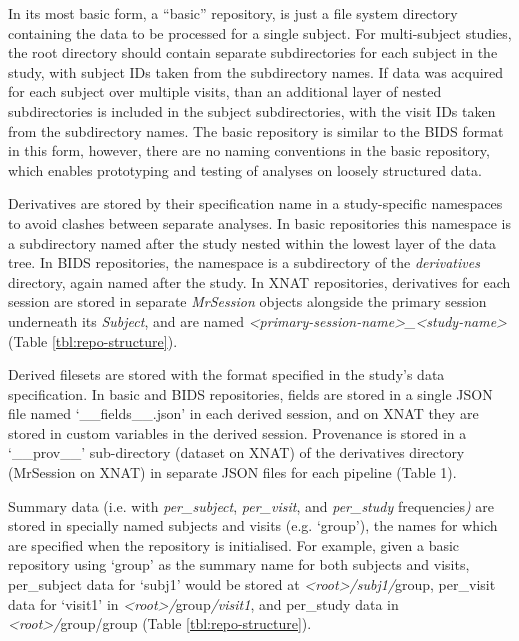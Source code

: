 \documentclass[smallextended]{svjour3}       %
\begin{document}
In its most basic form, a ``basic'' repository, is just a file system
directory containing the data to be processed for a single subject.
For multi-subject studies, the root directory should contain separate
subdirectories for each subject in the study, with subject IDs taken
from the subdirectory names. If data was acquired for each subject
over multiple visits, than an additional layer of nested subdirectories
is included in the subject subdirectories, with the visit IDs taken from
the subdirectory names. The basic
repository is similar to the BIDS format in this form, however, there are no naming
conventions in the basic repository, which enables prototyping and
testing of analyses on loosely structured data.

Derivatives are stored by their specification name in a study-specific
namespaces to avoid clashes between separate analyses. In basic
repositories this namespace is a subdirectory named after the study
nested within the lowest layer of the data tree. In BIDS repositories, the namespace is a subdirectory of the
\emph{derivatives} directory, again named after the study. In XNAT
repositories, derivatives for each session are stored in separate
\emph{MrSession} objects alongside the primary session underneath its
\emph{Subject}, and are named
\emph{\textless{}primary-session-name\textgreater{}\_\textless{}study-name\textgreater{}}
(Table \ref{tbl:repo-structure}).

Derived filesets are stored with the format specified in the study's
data specification. In basic and BIDS repositories, fields are
stored in a single JSON file named `\_\_fields\_\_.json' in each derived
session, and on XNAT they are stored in custom variables in the derived
session. Provenance is stored in a `\_\_prov\_\_' sub-directory (dataset
on XNAT) of the derivatives directory (MrSession on XNAT) in separate
JSON files for each pipeline (Table 1).

Summary data (i.e. with \emph{per\_subject}, \emph{per\_visit}, and
\emph{per\_study} frequencies\emph{)} are stored in specially named
subjects and visits (e.g. `group'), the names for which are specified when
the repository is initialised. For example, given a basic
repository using `group' as the summary name for both subjects and visits,
per\_subject data for `subj1' would be stored at
\emph{\textless{}root\textgreater{}/subj1/}group, per\_visit data for
`visit1' in \emph{\textless{}root\textgreater{}/}group\emph{/visit1},
and per\_study data in \\ \emph{\textless{}root\textgreater{}/}group/group
(Table \ref{tbl:repo-structure}).
\end{document}
